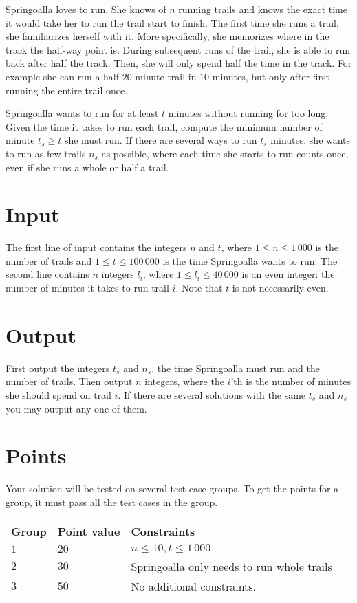 Springoalla loves to run.
She knows of $n$ running trails and knows the exact time it would take her to run the trail start to finish.
The first time she runs a trail, she familiarizes herself with it.
More specifically, she memorizes where in the track the half-way point is.
During subsequent runs of the trail, she is able to run back after half the track.
Then, she will only spend half the time in the track.
For example she can run a half $20$ minute trail in $10$ minutes, but only after first running the entire trail once.

Springoalla wants to run for at least $t$ minutes without running for too long.
Given the time it takes to run each trail, compute the minimum number of minute $t_s \ge t$ she must run.
If there are several ways to run $t_s$ minutes, she wants to run as few trails $n_s$ as possible, where each time she starts to run counts once, even if she runs a whole or half a trail.

\section*{Input}
The first line of input contains the integers $n$ and $t$, where $1 \le n \le 1\,000$ is the number of trails and $1 \le t \le 100\,000$ is the time Springoalla wants to run.
The second line contains $n$ integers $l_i$, where $1 \le l_i \le 40\,000$ is an even integer: the number of minutes it takes to run trail $i$.
Note that $t$ is not necessarily even.

\section*{Output}
First output the integers $t_s$ and $n_s$, the time Springoalla must run and the number of trails.
Then output $n$ integers, where the $i$'th is the number of minutes she should spend on trail $i$.
If there are several solutions with the same $t_s$ and $n_s$ you may output any one of them.


\section*{Points}
Your solution will be tested on several test case groups.
To get the points for a group, it must pass all the test cases in the group.

\noindent
\begin{tabular}{| l | l | p{12cm} |}
  \hline
  \textbf{Group} & \textbf{Point value} & \textbf{Constraints} \\ \hline
  $1$    & $20$        & $n \le 10, t \le 1\,000$ \\ \hline 
  $2$    & $30$        & Springoalla only needs to run whole trails \\ \hline
  $3$    & $50$        & No additional constraints. \\ \hline 
\end{tabular}
